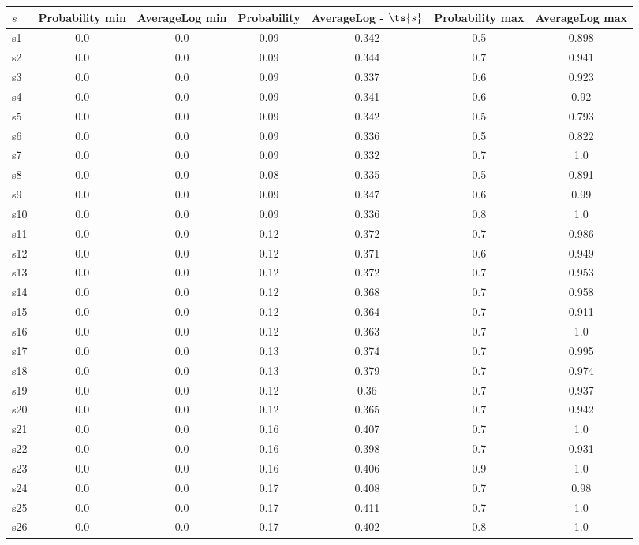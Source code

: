 \documentclass{article}
\begin{document}
\noindent\begin{tabular}{|l|c|c|c|c|c|c|}
\hline
$s$& Probability min & AverageLog min & Probability & AverageLog - $\ts{s}$ & Probability max & AverageLog max\\
\hline
s1 &0.0 & 0.0 & 0.09 & 0.342 & 0.5 & 0.898\\
\hline
s2 &0.0 & 0.0 & 0.09 & 0.344 & 0.7 & 0.941\\
\hline
s3 &0.0 & 0.0 & 0.09 & 0.337 & 0.6 & 0.923\\
\hline
s4 &0.0 & 0.0 & 0.09 & 0.341 & 0.6 & 0.92\\
\hline
s5 &0.0 & 0.0 & 0.09 & 0.342 & 0.5 & 0.793\\
\hline
s6 &0.0 & 0.0 & 0.09 & 0.336 & 0.5 & 0.822\\
\hline
s7 &0.0 & 0.0 & 0.09 & 0.332 & 0.7 & 1.0\\
\hline
s8 &0.0 & 0.0 & 0.08 & 0.335 & 0.5 & 0.891\\
\hline
s9 &0.0 & 0.0 & 0.09 & 0.347 & 0.6 & 0.99\\
\hline
s10 &0.0 & 0.0 & 0.09 & 0.336 & 0.8 & 1.0\\
\hline
s11 &0.0 & 0.0 & 0.12 & 0.372 & 0.7 & 0.986\\
\hline
s12 &0.0 & 0.0 & 0.12 & 0.371 & 0.6 & 0.949\\
\hline
s13 &0.0 & 0.0 & 0.12 & 0.372 & 0.7 & 0.953\\
\hline
s14 &0.0 & 0.0 & 0.12 & 0.368 & 0.7 & 0.958\\
\hline
s15 &0.0 & 0.0 & 0.12 & 0.364 & 0.7 & 0.911\\
\hline
s16 &0.0 & 0.0 & 0.12 & 0.363 & 0.7 & 1.0\\
\hline
s17 &0.0 & 0.0 & 0.13 & 0.374 & 0.7 & 0.995\\
\hline
s18 &0.0 & 0.0 & 0.13 & 0.379 & 0.7 & 0.974\\
\hline
s19 &0.0 & 0.0 & 0.12 & 0.36 & 0.7 & 0.937\\
\hline
s20 &0.0 & 0.0 & 0.12 & 0.365 & 0.7 & 0.942\\
\hline
s21 &0.0 & 0.0 & 0.16 & 0.407 & 0.7 & 1.0\\
\hline
s22 &0.0 & 0.0 & 0.16 & 0.398 & 0.7 & 0.931\\
\hline
s23 &0.0 & 0.0 & 0.16 & 0.406 & 0.9 & 1.0\\
\hline
s24 &0.0 & 0.0 & 0.17 & 0.408 & 0.7 & 0.98\\
\hline
s25 &0.0 & 0.0 & 0.17 & 0.411 & 0.7 & 1.0\\
\hline
s26 &0.0 & 0.0 & 0.17 & 0.402 & 0.8 & 1.0\\

\end{tabular}
\end{document}

